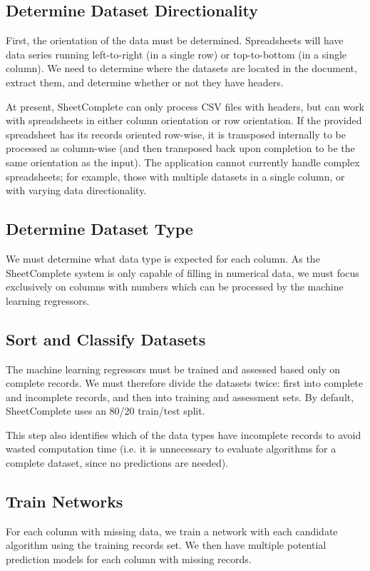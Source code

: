 \documentclass[conference]{IEEEtran}
\begin{document}
\subsection{Determine Dataset Directionality}
First, the orientation of the data must be determined. Spreadsheets will have data series running left-to-right (in a single row) or top-to-bottom (in a single column). We need to determine where the datasets are located in the document, extract them, and determine whether or not they have headers.

At present, SheetComplete can only process CSV files with headers, but can work with spreadsheets in either column orientation or row orientation. If the provided spreadsheet has its records oriented row-wise, it is transposed internally to be processed as column-wise (and then transposed back upon completion to be the same orientation as the input). The application cannot currently handle complex spreadsheets; for example, those with multiple datasets in a single column, or with varying data directionality.

\subsection{Determine Dataset Type}
We must determine what data type is expected for each column. As the SheetComplete system is only capable of filling in numerical data, we must focus exclusively on columns with numbers which can be processed by the machine learning regressors. 

\subsection{Sort and Classify Datasets}
The machine learning regressors must be trained and assessed based only on complete records. We must therefore divide the datasets twice: first into complete and incomplete records, and then into training and assessment sets. By default, SheetComplete uses an 80/20 train/test split.

This step also identifies which of the data types have incomplete records to avoid wasted computation time (i.e. it is unnecessary to evaluate algorithms for a complete dataset, since no predictions are needed).

\subsection{Train Networks}
For each column with missing data, we train a network with each candidate algorithm using the training records set. We then have multiple potential prediction models for each column with missing records.
\end{document}
